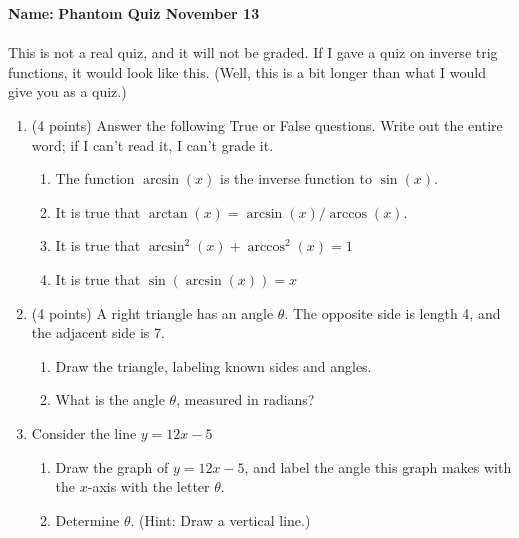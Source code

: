 \documentclass{article}
\begin{document}
\noindent \textbf{Name:}\underline{\hspace{2in}} \hfill \textbf{Phantom Quiz November 13}
\\ \\
This is not a real quiz, and it will not be graded. If I gave a quiz on inverse trig functions, it would look like this. (Well, this is a bit longer than what I would give you as a quiz.)
\begin{enumerate}
\item (4 points) Answer the following True or False questions. Write out the entire word; if I can't read it, I can't grade it.
  \begin{enumerate}
    \setlength\itemsep{2em}
  \item \underline{\hspace{1in}} The function $\arcsin(x)$ is the inverse function to $\sin(x)$.
  \item \underline{\hspace{1in}} It is true that $\arctan(x) = \arcsin(x) / \arccos(x)$.
  \item \underline{\hspace{1in}} It is true that $\arcsin^2(x) + \arccos^2(x) = 1$
  \item \underline{\hspace{1in}} It is true that $\sin(\arcsin(x)) = x$
  \end{enumerate}
  \vspace{0.2in}
\item (4 points) A right triangle has an angle $\theta$. The opposite side is length 4, and the adjacent side is 7.
  \begin{enumerate}
  \item Draw the triangle, labeling known sides and angles.
    \vspace{1in}
  \item What is the angle $\theta$, measured in radians? 
  \end{enumerate}
  \vspace{1in}
\item Consider the line $y = 12 x - 5$
  \begin{enumerate}
  \item Draw the graph of $y = 12x - 5$, and label the angle this graph makes with the $x$-axis with the letter $\theta$.
    \vspace{1.5in}
  \item Determine $\theta$. (Hint: Draw a vertical line.)
  \end{enumerate}


\end{enumerate}
\end{document}
